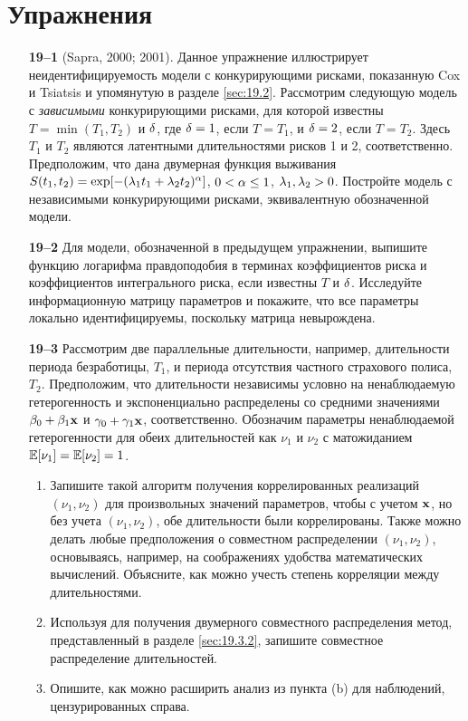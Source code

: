 \section*{Упражнения}
\begin{enumerate}

    \item[\textbf{19--1}]
(Sapra, 2000; 2001). Данное упражнение иллюстрирует неидентифицируемость модели с конкурирующими рисками, показанную Cox и Tsiatsis и упомянутую в разделе \ref{sec:19.2}. Рассмотрим следующую модель с \textit{зависимыми} конкурирующими рисками, для которой известны $T = \min(T_1, T_2)$ и $\delta$, где $\delta = 1$, если $T = T_1$, и $\delta = 2$, если $T = T_2$. Здесь $T_1$ и $T_2$ являются латентными длительностями рисков 1 и 2, соответственно. Предположим, что дана двумерная функция выживания $S(t_1, t_2) = \exp[-(\lambda_1 t_1 + \lambda_2 t_2)^\alpha]$, $0 < \alpha \le 1$, $\lambda_1, \lambda_2 > 0$. Постройте модель с независимыми конкурирующими рисками, эквивалентную обозначенной модели.

    \item[\textbf{19--2}]
Для модели, обозначенной в предыдущем упражнении, выпишите функцию логарифма правдоподобия в терминах коэффициентов риска и коэффициентов интегрального риска, если известны $T$ и $\delta$. Исследуйте информационную матрицу параметров и покажите, что все параметры локально идентифицируемы, поскольку матрица невырождена.

    \item[\textbf{19--3}]
Рассмотрим две параллельные длительности, например, длительности периода безработицы, $T_1$, и периода отсутствия частного страхового полиса, $T_2$. Предположим, что длительности независимы условно на ненаблюдаемую гетерогенность и экспоненциально распределены со средними значениями $\beta_0 + \beta_1\mathbf{x}$ и $\gamma_0 + \gamma_1\mathbf{x}$, соответственно. Обозначим параметры ненаблюдаемой гетерогенности для обеих длительностей как $\nu_1$ и $\nu_2$ с матожиданием $\mathbb{E}[\nu_1] = \mathbb{E}[\nu_2] = 1$.
        \begin{enumerate}
        \item
Запишите такой алгоритм получения коррелированных реализаций $(\nu_1, \nu_2)$ для произвольных значений параметров, чтобы с учетом $\mathbf{x}$, но без учета $(\nu_1, \nu_2)$, обе длительности были коррелированы. Также можно делать любые предположения о совместном распределении $(\nu_1, \nu_2)$, основываясь, например, на соображениях удобства математических вычислений. Объясните, как можно учесть степень корреляции между длительностями.
        \item
Используя для получения двумерного совместного распределения метод, представленный в разделе \ref{sec:19.3.2}, запишите совместное распределение длительностей.
        \item
Опишите, как можно расширить анализ из пункта (b) для наблюдений, цензурированных справа.
        \end{enumerate}



\end{enumerate}
